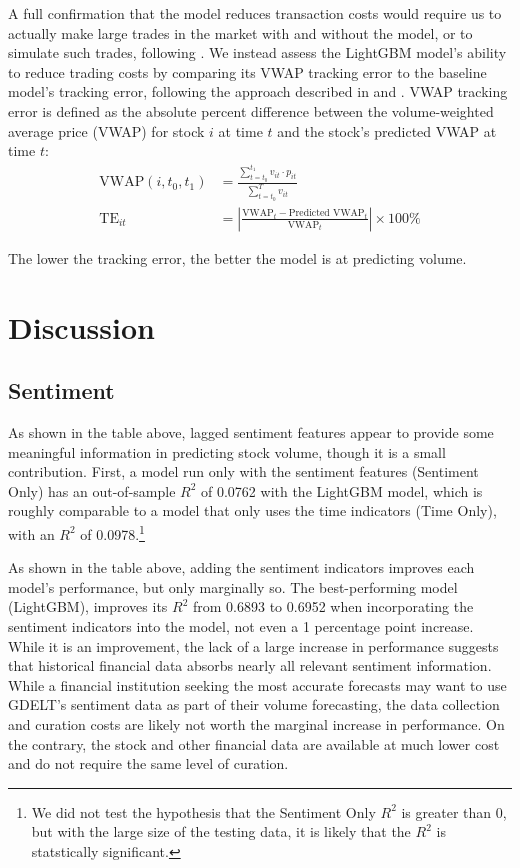 \documentclass[12pt]{article}
\begin{document}
A full confirmation that the model reduces transaction costs would require us to actually make large trades in the market with and without the model, or to simulate such trades, following \textcite{satish2014predicting}. We instead assess the LightGBM model's ability to reduce trading costs by comparing its VWAP tracking error to the baseline model's tracking error, following the approach described in \textcite{cucuringu2025forecasting} and \textcite{chen2016forecasting}. VWAP tracking error is defined as the absolute percent difference between the volume-weighted average price (VWAP) for stock $i$ at time $t$ and the stock's predicted VWAP at time $t$:
\begin{align}
    \text{VWAP}(i,t_0,t_1) &= \frac{\sum_{t=t_0}^{t_1} v_{it} \cdot p_{it}}{\sum_{t=t_0}^T v_{it}} \\
    \text{TE}_{it} &= \left| \frac{\text{VWAP}_t - \text{Predicted VWAP}_t}{\text{VWAP}_t} \right| \times 100\%
\end{align}

The lower the tracking error, the better the model is at predicting volume.

\newpage
\section{Discussion}
\subsection{Sentiment}
As shown in the table above, lagged sentiment features appear to provide some meaningful information in predicting stock volume, though it is a small contribution. First, a model run only with the sentiment features (Sentiment Only) has an out-of-sample $R^2$ of 0.0762 with the LightGBM model, which is roughly comparable to a model that only uses the time indicators (Time Only), with an $R^2$ of 0.0978.\footnote{We did not test the hypothesis that the Sentiment Only $R^2$ is greater than 0, but with the large size of the testing data, it is likely that the $R^2$ is statstically significant.}

As shown in the table above, adding the sentiment indicators improves each model's performance, but only marginally so. The best-performing model (LightGBM), improves its $R^2$ from 0.6893 to 0.6952 when incorporating the sentiment indicators into the model, not even a 1 percentage point increase. While it is an improvement, the lack of a large increase in performance suggests that historical financial data absorbs nearly all relevant sentiment information. While a financial institution seeking the most accurate forecasts may want to use GDELT's sentiment data as part of their volume forecasting, the data collection and curation costs are likely not worth the marginal increase in performance. On the contrary, the stock and other financial data are available at much lower cost and do not require the same level of curation.
\end{document}
